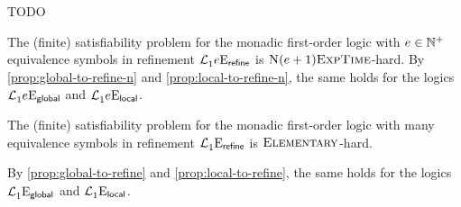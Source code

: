 TODO
\begin{proposition}
The (finite) satisfiability problem for the monadic first-order logic with
$e \in \mathbb{N}^{+}$ equivalence symbols in refinement
$\mathcal{L}^{{}}_{1}{e}\mathrm{E}_{\mathsf{refine}}$ is $\text{\normalfont{\scshape N}}(e+1)\text{\normalfont{\scshape ExpTime}}$-hard.
By \cref{prop:global-to-refine-n} and \cref{prop:local-to-refine-n}, the same
holds for the logics $\mathcal{L}^{{}}_{1}{e}\mathrm{E}_{\mathsf{global}}$ and
$\mathcal{L}^{{}}_{1}{e}\mathrm{E}_{\mathsf{local}}$.
\end{proposition}

\begin{proposition}
The (finite) satisfiability problem for the monadic first-order logic with many
equivalence symbols in refinement $\mathcal{L}^{{}}_{1}{{}}\mathrm{E}_{\mathsf{refine}}$ is
$\text{\normalfont{\scshape Elementary}}$-hard.

By \cref{prop:global-to-refine} and \cref{prop:local-to-refine}, the same
holds for the logics $\mathcal{L}^{{}}_{1}{{}}\mathrm{E}_{\mathsf{global}}$ and
$\mathcal{L}^{{}}_{1}{{}}\mathrm{E}_{\mathsf{local}}$.
\end{proposition}